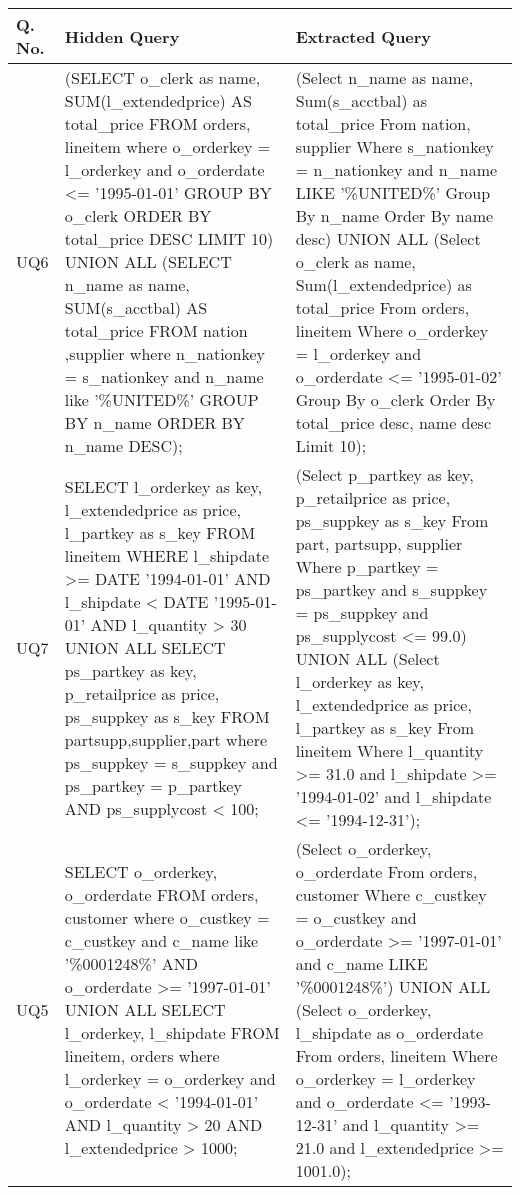 {\tiny
\begin{longtable}{|p{0.5cm}|p{7cm}|p{7cm}|}
\hline
{\bf Q. No.} & {\bf Hidden Query} & {\bf Extracted Query} \\\hline\hline
UQ6&
(SELECT o\_clerk as name, SUM(l\_extendedprice) AS total\_price FROM orders, lineitem where o\_orderkey = l\_orderkey and o\_orderdate <= '1995-01-01' GROUP BY o\_clerk ORDER BY total\_price DESC LIMIT 10) UNION ALL (SELECT n\_name as name, SUM(s\_acctbal) AS total\_price FROM nation ,supplier where n\_nationkey = s\_nationkey and n\_name like '\%UNITED\%' GROUP BY n\_name ORDER BY n\_name DESC);&
(Select n\_name as name, Sum(s\_acctbal) as total\_price From nation, supplier Where s\_nationkey = n\_nationkey and n\_name LIKE '\%UNITED\%' Group By n\_name Order By name desc)  UNION ALL  (Select o\_clerk as name, Sum(l\_extendedprice) as total\_price From orders, lineitem Where o\_orderkey = l\_orderkey and o\_orderdate  <= '1995-01-02' Group By o\_clerk Order By total\_price desc, name desc Limit 10);\\\hline
UQ7&
SELECT     l\_orderkey as key,     l\_extendedprice as price,     l\_partkey as s\_key FROM     lineitem WHERE     l\_shipdate >= DATE '1994-01-01'     AND l\_shipdate < DATE '1995-01-01'     AND l\_quantity > 30  UNION ALL  SELECT     ps\_partkey as key,     p\_retailprice as price,     ps\_suppkey as s\_key FROM     partsupp,supplier,part where ps\_suppkey = s\_suppkey and ps\_partkey = p\_partkey     AND ps\_supplycost < 100;&
(Select p\_partkey as key, p\_retailprice as price, ps\_suppkey as s\_key From part, partsupp, supplier Where p\_partkey = ps\_partkey and s\_suppkey = ps\_suppkey and ps\_supplycost  <= 99.0)  UNION ALL  (Select l\_orderkey as key, l\_extendedprice as price, l\_partkey as s\_key From lineitem Where l\_quantity  >= 31.0 and l\_shipdate  >= '1994-01-02' and l\_shipdate <= '1994-12-31');\\\hline
UQ5&
SELECT o\_orderkey, o\_orderdate FROM orders, customer where o\_custkey = c\_custkey and c\_name like '\%0001248\%'  AND o\_orderdate >= '1997-01-01' UNION ALL SELECT l\_orderkey, l\_shipdate FROM lineitem, orders where l\_orderkey = o\_orderkey and o\_orderdate < '1994-01-01'   AND l\_quantity > 20   AND l\_extendedprice > 1000;&
(Select o\_orderkey, o\_orderdate From orders, customer Where c\_custkey = o\_custkey and o\_orderdate  >= '1997-01-01' and c\_name LIKE '\%0001248\%')  UNION ALL  (Select o\_orderkey, l\_shipdate as o\_orderdate From orders, lineitem Where o\_orderkey = l\_orderkey and o\_orderdate  <= '1993-12-31' and l\_quantity  >= 21.0 and l\_extendedprice  >= 1001.0);\\\hline

\end{longtable}}
